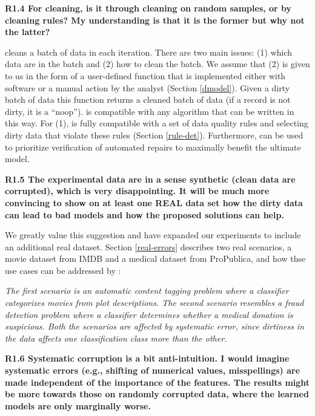 \vspace{0.5em}

\noindent\textbf{R1.4 For cleaning, is it through cleaning on random samples, or by cleaning rules? My understanding is that it is the former but why not the latter?}

\noindent \sys cleans a batch of data in each iteration. There are two main issues: (1) which data are in the batch and (2) how to clean the batch. We assume that (2) is given to us in the form of a user-defined function that is implemented either with software or a manual action by the analyst (Section \ref{dmodel}). 
Given a dirty batch of data this function returns a cleaned batch of data (if a record is not dirty, it is a ``noop'').
\sys is compatible with any algorithm that can be written in this way.
For (1), \sys is fully compatible with a set of data quality rules and selecting dirty data that violate these rules (Section \ref{rule-det}).
Furthermore, \sys can be used to prioritize verification of automated repairs to maximally benefit the ultimate model.

\vspace{0.5em}

\noindent\textbf{R1.5 The experimental data are in a sense synthetic (clean data are corrupted), which is very disappointing. It will be much more convincing to show on at least one REAL data set how the dirty data can lead to bad models and how the proposed solutions can help.}

\noindent We greatly value this suggestion and have expanded our experiments to include an additional real dataset.
Section \ref{real-errors} describes two real scenarios, a movie dataset from IMDB and a medical dataset from ProPublica, and how thse use cases can be addressed by \sys:

\emph{The first scenario is an automatic content tagging problem where a classifier categorizes movies from plot descriptions.
The second scenario resembles a fraud detection problem where a classifier determines whether a medical donation is suspicious.
Both the scenarios are affected by systematic error, since dirtiness in the data affects one classification class more than the other.}

\vspace{0.5em}

\noindent\textbf{R1.6 Systematic corruption is a bit anti-intuition. I would imagine systematic errors (e.g., shifting of numerical values, misspellings) are made independent of the importance of the features. The results might be more towards those on randomly corrupted data, where the learned models are only marginally worse.}

